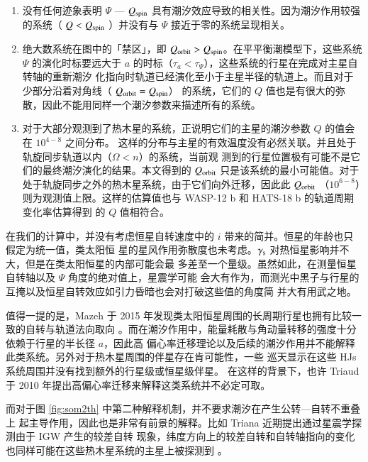 \begin{enumerate}
\item 没有任何迹象表明 $\Psi$ --- $Q_\mathrm{spin}$ 具有潮汐效应导致的相关性。因为潮汐作用较强的系统（
$Q < Q_\mathrm{spin}$ ）并没有与 $\Psi$ 接近于零的系统呈现相关。
\item 绝大数系统在图中的「禁区」，即 $Q_\mathrm{orbit} > Q_\mathrm{spin}$。在平平衡潮模型下，这些系统 $\Psi$ 
的演化时标要远大于 $a$ 的时标（$\tau_a < \tau_\Psi$），这些系统的行星在完成对主星自转轴的重新潮汐
化指向时轨道已经演化至小于主星半径的轨道上。而且对于少部分沿着对角线（ $Q_\mathrm{orbit} = Q_\mathrm{spin}$）
的系统，它们的 $Q$ 值也是有很大的弥散，因此不能用同样一个潮汐参数来描述所有的系统。
\item 对于大部分观测到了热木星的系统，正说明它们的主星的潮汐参数 $Q$ 的值会在 $10^{4-8}$ 之间分布。
这样的分布与主星的有效温度没有必然关联。并且处于轨旋同步轨道以内（$\Omega < n$）的系统，当前观
测到的行星位置极有可能不是它们的最终潮汐演化的结果\cite{Schlaufman2010}。本文得到的 $Q_\mathrm{orbit}$
只是该系统的最小可能值。对于处于轨旋同步之外的热木星系统，由于它们向外迁移，因此此 $Q_\mathrm{orbit}$
（$10^{6-8}$）则为观测值上限。这样的估算值也与 WASP-12 b 和 HATS-18 b 的轨道周期变化率估算得到
的 $Q$ 值相符合\cite{Maciejewski2016,Penev2016}。
\end{enumerate}


在我们的计算中，并没有考虑恒星自转速度中的 $i$ 带来的简并。恒星的年龄也只假定为统一值，类太阳恒
星的星风作用弥散度也未考虑。$\gamma_\mathrm{s}$ 对热恒星影响并不大，但是在类太阳恒星的内部可能会最
多差至一个量级。虽然如此，在测量恒星自转轴\cite{Hirano2012}以及 $\Psi$ 角度的绝对值上，星震学可能
会大有作为\cite{Chaplin2013,Benomar2014}，而测光中黑子与行星的互掩\cite{Desert2011,Nutzman2011,
SanchisOjeda2011}以及恒星自转效应如引力昏暗\cite{Barnes2011,Szabo2011}也会对打破这些值的角度简
并大有用武之地。

值得一提的是，Mazeh 于 2015 年发现类太阳恒星周围的长周期行星也拥有比较一致的自转与轨道法向取向
\cite{Mazeh2015}。而在潮汐作用中，能量耗散与角动量转移的强度十分依赖于行星的半长径 $a$，因此高
偏心率迁移理论以及后续的潮汐作用并不能解释此类系统。另外对于热木星周围的伴星存在肯可能性，一些
巡天显示在这些 HJs 系统周围并没有找到额外的行星级或恒星级伴星\cite{Schlaufman2016,Knutson2014}。
在这样的背景下，也许 Triaud 于 2010 年提出高偏心率迁移来解释这类系统并不必定可取\cite{Triaud2010}。

而对于图 \ref{fig:som2th} 中第二种解释机制\cite{Rogers2012}，并不要求潮汐在产生公转---自转不重叠上
起主导作用，因此也是非常有前景的解释。比如 Triana 近期提出通过星震学探测由于 IGW 产生的较差自转
现象，纬度方向上的较差自转和自转轴指向的变化也同样可能在这些热木星系统的主星上被探测到
\cite{Triana2015}。




